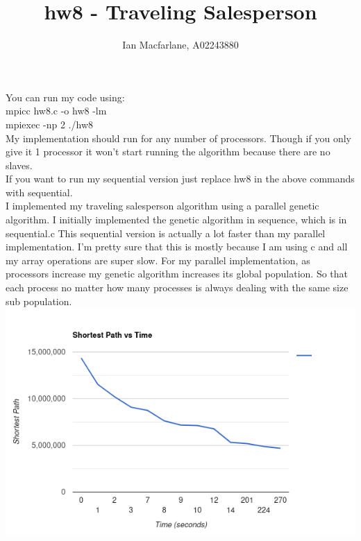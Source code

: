 \documentclass{article}
\title{hw8 - Traveling Salesperson}
\author{Ian Macfarlane, A02243880}
\begin{document}
\maketitle

You can run my code using:\\
mpicc hw8.c -o hw8 -lm\\
mpiexec -np 2 ./hw8\\
My implementation should run for any number of processors.
Though if you only give it 1 processor it won't start running the algorithm because there are no slaves.\\
If you want to run my sequential version just replace hw8 in the above commands with sequential.\\
I implemented my traveling salesperson algorithm using a parallel genetic algorithm.
I initially implemented the genetic algorithm in sequence, which is in sequential.c
This sequential version is actually a lot faster than my parallel implementation.
I'm pretty sure that this is mostly because I am using c and all my array operations are super slow.
For my parallel implementation, as processors increase my genetic algorithm increases its global population.
So that each process no matter how many processes is always dealing with the same size sub population.\\

\includegraphics[scale=.5]{graph}\\


\end{document}
